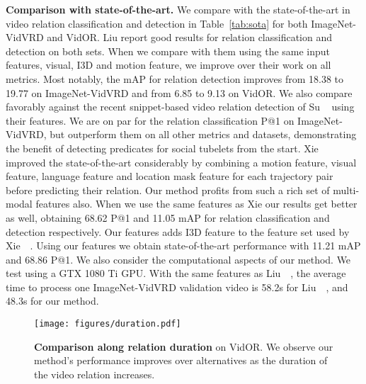 \documentclass[10pt,twocolumn,letterpaper]{article}
\begin{document}
\textbf{Comparison with state-of-the-art.} We compare with the state-of-the-art in video relation classification and  detection in Table~\ref{tab:sota} for both ImageNet-VidVRD and VidOR. Liu \etal \cite{liu2020beyond} report good results for relation classification and detection on both sets. When we compare with them using the same input features, \ie visual, I3D and motion feature, we improve over their work on all metrics. Most notably, the mAP for relation detection improves from 18.38 to 19.77 on ImageNet-VidVRD and from 6.85 to 9.13 on VidOR. We also compare favorably against the recent snippet-based video relation detection of Su \etal~\cite{su2020video} using their features. We are on par for the relation classification P@1 on ImageNet-VidVRD, but outperform them on all other metrics and datasets, demonstrating the benefit of detecting predicates for social tubelets from the start. Xie \etal~\cite{xie2020video} improved the state-of-the-art considerably by combining a motion feature, visual feature, language feature and location mask feature for each trajectory pair before predicting their relation. Our method profits from such a rich set of multi-modal features also. When we use the same features as Xie \etal our results get better as well, obtaining 68.62 P@1 and 11.05 mAP for relation classification and detection respectively.
Our features adds I3D feature to the feature set used by Xie~\etal~\cite{xie2020video}. Using our features we obtain state-of-the-art performance with 11.21 mAP and 68.86 P@1.
We also consider the computational aspects of our method. We test using a GTX 1080 Ti GPU. With the same features as Liu~\etal~\cite{liu2020beyond}, the average time to process one ImageNet-VidVRD validation video is 58.2s for Liu~\etal~\cite{liu2020beyond}, and 48.3s for our method.

\begin{figure}[t!]
    \centering
    \texttt{[image: figures/duration.pdf]}
    \caption{\textbf{Comparison along relation duration} on VidOR. We observe our method's performance improves over alternatives as the duration of the video relation increases. }
\label{fig:length}
\end{figure}
\end{document}
